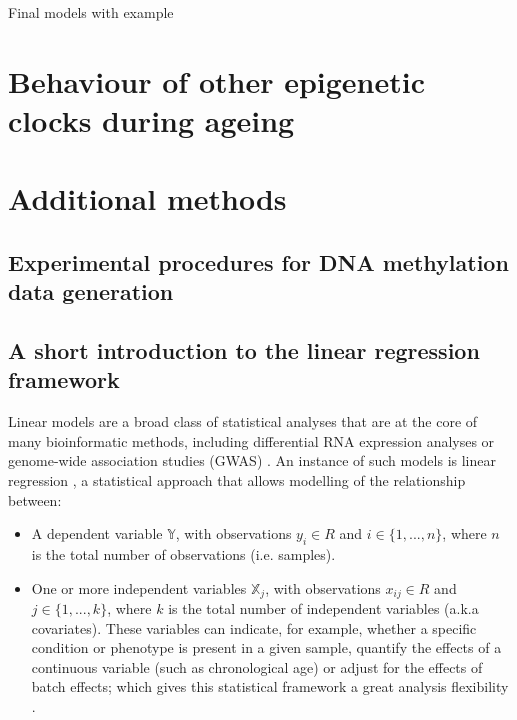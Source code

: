 Final models with example

\smallskip






\section{Behaviour of other epigenetic clocks during ageing}

\smallskip



\section{Additional methods}

\subsection*{Experimental procedures for DNA methylation data generation}

\subsection*{A short introduction to the linear regression framework}

Linear models are a broad class of statistical analyses that are at the core of many bioinformatic methods, including differential RNA expression analyses \cite{Ritchie2015} or genome-wide association studies (GWAS) \cite{Visscher2017}. An instance of such models is linear regression \cite{Eaton2007}, a statistical approach that allows modelling of the relationship between:

\begin{itemize}
	
	\item A dependent variable $\mathbb Y$, with observations $y_i \in R$ and $i \in \{1, ..., n\}$, where $n$ is the total number of observations (i.e. samples). 
	
	\item One or more independent variables $\mathbb X_j$, with observations $x_{ij} \in R$ and $j \in \{1, ..., k\}$, where $k$ is the total number of independent variables (a.k.a covariates). These variables can indicate, for example, whether a specific condition or phenotype is present in a given sample, quantify the effects of a continuous variable (such as chronological age) or adjust for the effects of batch effects; which gives this statistical framework a great analysis flexibility \cite{Ritchie2015}.
	
\end{itemize}

